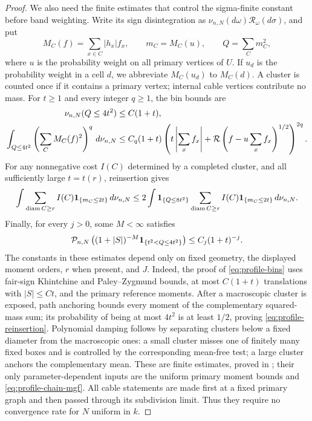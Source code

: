 \begin{proof}
We also need the finite estimates that control the sigma-finite
constant before band weighting.  Write its sign disintegration as
\(\nu_{n,N}(d\omega)\mathcal R_\omega(d\sigma)\), and put
\[
 M_C(f)=\sum_{x\in C}|h_x|f_x,\qquad
 m_C=M_C(u),\qquad Q=\sum_Cm_C^2,
\]
where \(u\) is the probability weight on all primary vertices of
\(U\).  If \(u_d\) is the probability weight in a cell \(d\),
we abbreviate \(M_C(u_d)\) to \(M_C(d)\).  A cluster is counted once
if it contains a primary vertex;
internal cable vertices contribute no mass.  For \(t\ge1\) and every
integer \(q\ge1\), the bin bounds are
\begin{align}
 \nu_{n,N}(Q\le4t^2)&\le C(1+t),\notag\\
 \int_{Q\le4t^2}\left(\sum_CM_C(f)^2\right)^q\,d\nu_{n,N}
 &\le C_q(1+t)
 \left(t\left|\sum_xf_x\right|
       +\mathcal R\left(f-u\sum_xf_x\right)^{1/2}\right)^{2q}.
 \label{eq:profile-bins}
\end{align}
For any nonnegative cost \(I(C)\) determined by a completed cluster,
and all sufficiently large \(t=t(r)\), reinsertion gives
\begin{equation}\label{eq:profile-reinsertion}
 \int\sum_{\operatorname{diam} C\ge r}I(C)\mathbf 1_{\{m_C\le2t\}}\,d\nu_{n,N}
 \le2\int\mathbf 1_{\{Q\le8t^2\}}
          \sum_{\operatorname{diam} C\ge r}I(C)\mathbf 1_{\{m_C\le2t\}}\,d\nu_{n,N}.
\end{equation}
Finally, for every \(j>0\), some \(M<\infty\) satisfies
\begin{equation}\label{eq:profile-damping}
 \mathcal P_{n,N}\left((1+|S|)^{-M}
             \mathbf 1_{\{t^2<Q\le4t^2\}}\right)
                       \le C_j(1+t)^{-j}.
\end{equation}
The constants in these estimates depend only on fixed geometry,
the displayed moment orders, \(r\) when present, and \(J\).
Indeed, the proof of \eqref{eq:profile-bins} uses fair-sign
Khintchine and Paley--Zygmund bounds, at most \(C(1+t)\)
translations with \(|S|\le Ct\), and the primary reference moments.
After a macroscopic cluster is exposed, path anchoring bounds every
moment of the complementary squared-mass sum; its probability of
being at most \(4t^2\) is at least \(1/2\), proving
\eqref{eq:profile-reinsertion}.  Polynomial damping follows by
separating clusters below a fixed diameter from the macroscopic
ones: a small cluster misses one of finitely many fixed boxes and
is controlled by the corresponding mean-free test; a large cluster
anchors the complementary mean.  These are finite estimates, proved
in \cite[Lemma~3.5, Equations~(3.7)--(3.9)]{X}; their only parameter-dependent inputs are the
uniform primary moment bounds and \eqref{eq:profile-chain-mgf}.
All cable statements are made first at a fixed primary graph and then
passed through its subdivision limit.  Thus they require no convergence
rate for \(N\) uniform in \(k\).


\end{proof}
